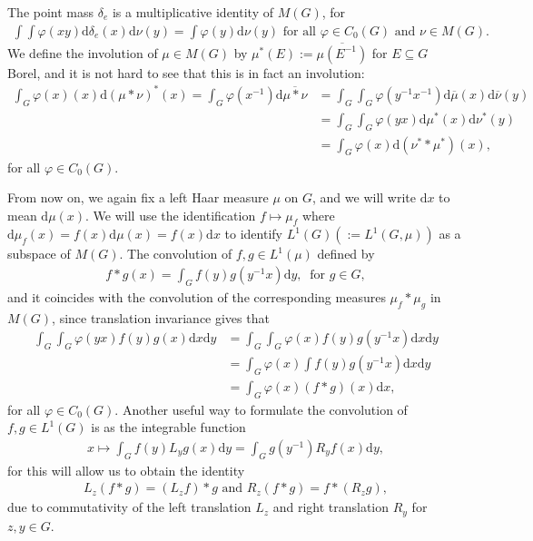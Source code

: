 \documentclass[10pt,twoside,openany,final]{memoir}
\theoremstyle{definition}
\theoremstyle{Break}
\renewcommand{\d}{\mathrm{d}}
\begin{document}
The point mass $\delta_e$ is a multiplicative identity of $M(G)$, for 
\begin{align*}
	\int\int \varphi(xy) \d \delta_e(x) \d \nu(y)= \int \varphi(y) \d \nu(y) \text{ for all } \varphi \in C_0(G) \text{ and } \nu \in M(G).
\end{align*}
We define the involution of $\mu \in M(G)$ by $\mu^*(E):=\overline{\mu(E^{-1})}$ for $E\subseteq G$ Borel, and it is not hard to see that this is in fact an involution:
\begin{align*}
	\int_G \varphi(x)(x) \d (\mu \ast \nu)^*(x) = \int_G \varphi(x^{-1}) \d \overline{\mu \ast \nu} &= \int_{G} \int_G \varphi(y^{-1}x^{-1}) \d \overline{\mu}(x) \d \overline{\nu}(y)\\
	&= \int_G\int_G \varphi(yx) \d \mu^*(x) \d \nu^*(y)\\
	&= \int_G \varphi(x) \d (\nu^* \ast \mu^*)(x),
\end{align*}
for all $\varphi \in C_0(G)$. 

From now on, we again fix a left Haar measure $\mu$ on $G$, and we will write $\d x$ to mean $\d \mu(x)$. We will use the identification $f \mapsto \mu_f$ where $\d \mu_f(x)= f(x)\d \mu(x)=f(x) \d x$ to identify $L^1(G)(:=L^1(G,\mu))$ as a subspace of $M(G)$. The convolution of $f,g \in L^1(\mu)$ defined by
\begin{align*}
	f \ast g (x) = \int_G f(y) g(y^{-1}x) \d y, \ \text{ for } g \in G,
\end{align*}
and it coincides with the convolution of the corresponding measures $\mu_f \ast \mu_g$ in $M(G)$, since translation invariance gives that 
\begin{align*}
	\int_G \int_G \varphi(yx) f(y) g(x) \d x \d y &= \int_G \int_G \varphi(x) f(y) g(y^{-1}x) \d x \d y\\
	&= \int_G \varphi(x) \int f(y) g (y^{-1}x) \d x \d y \\
	&= \int_G \varphi(x) (f \ast g)(x) \d x,
\end{align*}
for all $\varphi \in C_0(G)$. Another useful way to formulate the convolution of $f,g \in L^1(G)$ is as the integrable function
\begin{align}
	x \mapsto \int_G f(y) L_y g(x) \d y=\int_G g(y^{-1}) R_yf(x) \d y, \label{2.38}
\end{align}
for this will allow us to obtain the identity
\begin{align}
	L_z(f \ast g)=(L_z f) \ast g \text {  and  } R_z (f \ast g) = f \ast(R_zg),
	\label{id:leftconv}
\end{align}
due to commutativity of the left translation $L_z$ and right translation $R_y$ for $z,y \in G$.
\end{document}
